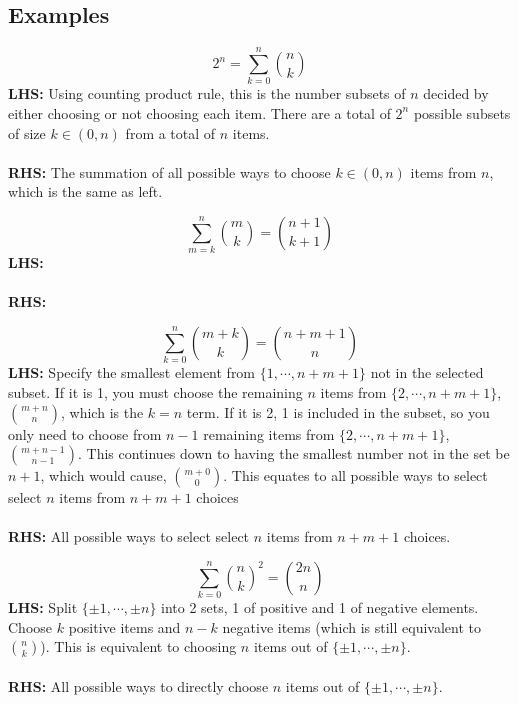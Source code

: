 \documentclass{article}\usepackage{amsmath,amssymb,amsthm,tikz,tkz-graph,color,chngpage,soul,hyperref,csquotes,graphicx,floatrow, listings}\newcommand*{\QEDB}{\hfill\ensuremath{\square}}\newtheorem*{prop}{Proposition}\renewcommand{\theenumi}{\alph{enumi}}\usepackage[shortlabels]{enumitem}\usepackage[nobreak=true]{mdframed}\usetikzlibrary{matrix,calc}\MakeOuterQuote{"}\usepackage[margin=0.75in]{geometry} \newtheorem{theorem}{Theorem}\newcommand{\Z}{\mathbb Z}\newcommand{\R}{\mathbb R}\newcommand{\Q}{\mathbb Q}\newcommand{\N}{\mathbb N}\newcommand{\x}[1]{\textrm{ #1 }}\newcommand{\pr}{\textrm{Pr}}
\newcommand{\sumlim}[3]{\sum\limits_{#1}^{#2}#3}
\newcommand{\eq}[1]{\begin{equation}#1\end{equation}}
\begin{document}
\subsection*{Examples}
\begin{mdframed}
\begin{equation}2^n=\sumlim{k=0}{n}{\binom{n}{k}}\end{equation}
\textbf{LHS:} Using counting product rule, this is the number subsets of $n$ decided by either choosing or not choosing each item. There are a total of $2^n$ possible subsets of size $k \in (0,n)$ from a total of $n$ items.\\\\
\textbf{RHS:} The summation of all possible ways to choose $k \in (0,n)$ items from $n$, which is the same as left.
\end{mdframed}
\begin{mdframed}
\begin{equation}\sumlim{m=k}{n}{\binom{m}{k}}=\binom{n+1}{k+1}\end{equation}
\textbf{LHS:} \\\\
\textbf{RHS:} 
\end{mdframed}
\begin{mdframed}
\eq{\sumlim{k=0}{n}{\binom{m+k}{k}}=\binom{n+m+1}{n}}
\textbf{LHS:} Specify the smallest element from $\{1,\cdots,n+m+1\}$ not in the selected subset. If it is 1, you must choose the remaining $n$ items from $\{2,\cdots,n+m+1\}$, $\binom{m+n}{n}$, which is the $k=n$ term. If it is 2, 1 is included in the subset, so you only need to choose from $n-1$ remaining items from $\{2,\cdots,n+m+1\}$, $\binom{m+n-1}{n-1}$. This continues down to having the smallest number not in the set be $n+1$, which would cause, $\binom{m+0}{0}$. This equates to all possible ways to select select $n$ items from $n+m+1$ choices\\\\
\textbf{RHS:} All possible ways to select select $n$ items from $n+m+1$ choices.
\end{mdframed}
\begin{mdframed}
\eq{\sumlim{k=0}{n}{\binom{n}{k}^2}=\binom{2n}{n}}
\textbf{LHS:} Split $\{\pm1,\cdots,\pm n\}$ into 2 sets, 1 of positive and 1 of negative elements. Choose $k$ positive items and $n-k$ negative items (which is still equivalent to $\binom{n}{k}$). This is equivalent to choosing $n$ items out of $\{\pm1,\cdots,\pm n\}$.\\\\
\textbf{RHS:} All possible ways to directly choose $n$ items out of $\{\pm1,\cdots,\pm n\}$.
\end{mdframed}
\end{document}
